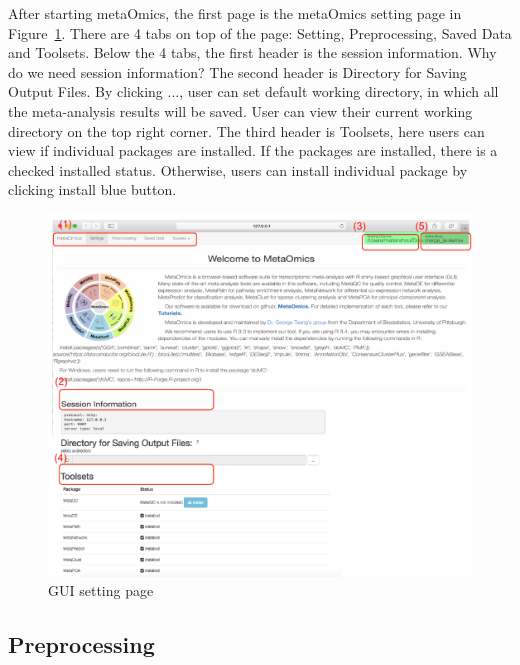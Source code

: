
After starting metaOmics, 
the first page is the metaOmics setting page in Figure~\ref{fig:GUIsetting}.  
There are 4 tabs on top of the page: Setting, Preprocessing, Saved Data and Toolsets.
Below the 4 tabs, 
the first header is the session information.
{
\color{red}
Why do we need session information?
}
The second header is Directory for Saving Output Files.
By clicking $\ldots$,
user can set default working directory, in which all the meta-analysis results will be saved.
User can view their current working directory on the top right corner.
The third header is Toolsets,
here users can view if individual packages are installed.
If the packages are installed, there is a checked installed status.
Otherwise, users can install individual package by clicking install blue button.

\begin{figure}[H]
\begin{center}
\includegraphics[scale=0.35]{./figure/preprocessing/GUIsetting}
\caption{GUI setting page}
\label{fig:GUIsetting}
\end{center}
\end{figure}

\subsection{Preprocessing}
